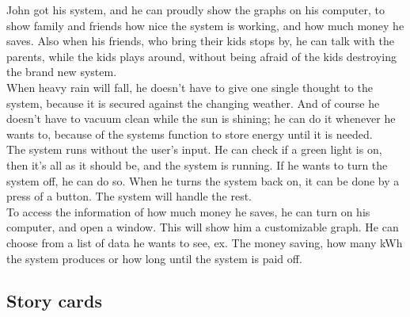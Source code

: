\documentclass[12pt,a4paper]{report}
\begin{document}
John got his system, and he can proudly show the graphs on his computer, to show family and friends how nice the system is working, and how much money he saves. Also when his friends, who bring their kids stops by, he can talk with the parents, while the kids plays around, without being afraid of the kids destroying the brand new system.\\

When heavy rain will fall, he doesn’t have to give one single thought to the system, because it is secured against the changing weather. And of course he doesn’t have to vacuum clean while the sun is shining; he can do it whenever he wants to, because of the systems function to store energy until it is needed.\\

The system runs without the user’s input. He can check if a green light is on, then it’s all as it should be, and the system is running. If he wants to turn the system off, he can do so. When he turns the system back on, it can be done by a press of a button. The system will handle the rest.\\

To access the information of how much money he saves, he can turn on his computer, and open a window. This will show him a customizable graph. He can choose from a list of data he wants to see, ex. The money saving, how many kWh the system produces or how long until the system is paid off.\\


\subsection{Story cards}
\end{document}
